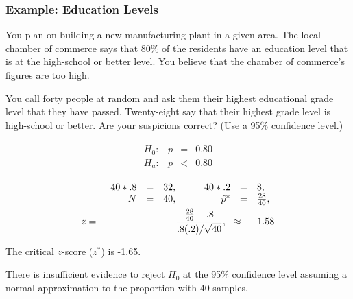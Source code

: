 \begin{frame}
  \frametitle{Example: Education Levels}

  \vspace*{-2em}
  You plan on building a new manufacturing plant in a given area. The
  local chamber of commerce says that 80\% of the residents have an
  education level that is at the high-school or better level. You
  believe that the chamber of commerce's figures are too high.

  You call forty people at random and ask them their highest
  educational grade level that they have passed. Twenty-eight say that
  their highest grade level is high-school or better. Are your
  suspicions correct? (Use a 95\% confidence level.)

  \vfill

  {
    \begin{eqnarray*}
      \begin{array}{lrcl}
        H_0: & p & = & 0.80 \\
        H_a: & p & < & 0.80
      \end{array}
    \end{eqnarray*}
  }

  {
    \begin{eqnarray*}
      & & 
      \begin{array}{rcl@{\hspace{3em}}rcl}
          40*.8 & = & 32, & 40*.2 & = & 8, \\
          N & = & 40, & \hat{p}^* & = & \frac{28}{40},
        \end{array} \\
      z & = & \frac{\frac{28}{40}-.8}{.8(.2)/\sqrt{40}}, ~~ \approx ~~ -1.58
    \end{eqnarray*}
  }
  

  {
    The critical $z$-score ($z^*$) is -1.65.
  }

  {

    {\color{red}
      There is insufficient evidence to reject $H_0$ at the 95\%
      confidence level assuming a normal approximation to the
      proportion with 40 samples.
    }

  }

  \vfill
  
\end{frame}


